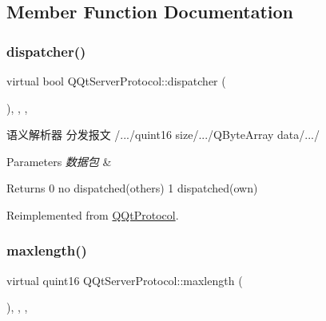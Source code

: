 \subsection{Member Function Documentation}
\mbox{\label{class_q_qt_server_protocol_a5649fe79c03f11076a4c3014c8013c25}} 
\subsubsection{\texorpdfstring{dispatcher()}{dispatcher()}}
{\footnotesize\ttfamily virtual bool Q\+Qt\+Server\+Protocol\+::dispatcher (\begin{DoxyParamCaption}\item[{const Q\+Byte\+Array \&}]{ }\end{DoxyParamCaption})\hspace{0.3cm}{\ttfamily [inline]}, {\ttfamily [override]}, {\ttfamily [protected]}, {\ttfamily [virtual]}}



语义解析器 分发报文 /.../quint16 size/.../\+Q\+Byte\+Array data/.../ 


\begin{DoxyParams}{Parameters}
{\em 数据包} & \\
\hline
\end{DoxyParams}
\begin{DoxyReturn}{Returns}
0 no dispatched(others) 1 dispatched(own) 
\end{DoxyReturn}


Reimplemented from \mbox{\hyperlink{class_q_qt_protocol_a35a69c4b89c8cf7459038f40d75e0dc9}{Q\+Qt\+Protocol}}.

\mbox{\label{class_q_qt_server_protocol_ac4822c4cab54e3c909683857f7e60e16}} 
\subsubsection{\texorpdfstring{maxlength()}{maxlength()}}
{\footnotesize\ttfamily virtual quint16 Q\+Qt\+Server\+Protocol\+::maxlength (\begin{DoxyParamCaption}{ }\end{DoxyParamCaption})\hspace{0.3cm}{\ttfamily [inline]}, {\ttfamily [override]}, {\ttfamily [protected]}, {\ttfamily [virtual]}}



